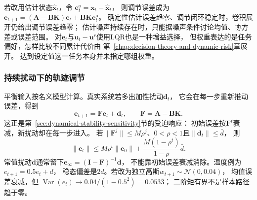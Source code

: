 若改用估计状态$\widehat{\bm x}_t$，令
$\bm e_t^{\mathrm o}=\bm x_t-\widehat{\bm x}_t$，
则调节误差成为
$\bm e_{t+1}=(\bm A-\bm B\bm K)\bm e_t+\bm B\bm K\bm e_t^{\mathrm o}$。
确定性估计误差趋零、调节闭环稳定时，卷积展开仍给出调节误差趋零；
估计噪声持续存在时，只能据噪声条件讨论均值、协方差或误差范围。
对$\bm e_t$与$\bm u_t-\bm u^r$使用LQR也是一种增益选择，
但权重表达的是任务偏好，怎样比较不同累计代价由
第~\ref{chap:decision-theory-and-dynamic-risk}章展开。
达到设定值这一任务本身并未指定哪组权重。

\subsubsection{持续扰动下的轨迹调节}
平衡输入按名义模型计算。真实系统若多出加性扰动$\bm d_t$，
它会在每一步重新推动误差，得到
\begin{equation}
  \bm e_{t+1}=\bm F\bm e_t+\bm d_t,
  \qquad \bm F=\bm A-\bm B\bm K.
  \label{eq:control-regulation-disturbance}
\end{equation}
这正是第~\ref{sec:dynamical-stability-sensitivity}节的受迫响应：
初始误差按$\bm F^t$衰减，新扰动却在每一步进入。
若$\|\bm F^j\|\leq M\rho^j$、$0<\rho<1$且$\|\bm d_t\|\leq\bar d$，
则
\[
  \|\bm e_t\|\leq M\rho^t\|\bm e_0\|
       +\frac{M(1-\rho^t)}{1-\rho}\bar d.
\]
常值扰动$\bm d$通常留下$\bm e_\infty=(\bm I-\bm F)^{-1}\bm d$，
不能靠初始误差衰减消除。温度例为$e_{t+1}=0.5e_t+d$，
稳态偏差是$2d$。若改为独立高斯$w_{t+1}\sim\mathcal N(0,0.04)$，
均值误差衰减，但
$\operatorname{Var}(e_t)\to0.04/(1-0.5^2)=0.053\overline3$；
二阶矩有界不是样本路径趋于零。

